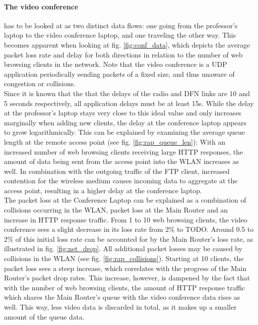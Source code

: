 \documentclass[
10pt, %
a4paper, %
oneside, %
headinclude,footinclude, %
BCOR5mm, %
]{scrartcl}
\begin{document}
\paragraph{The video conference} has to be looked at as two distinct data flows: one going from the professor's laptop to the video conference laptop, and one traveling the other way. This becomes apparent when looking at fig. \ref{fig:conf_data}, which depicts the average packet loss rate and delay for both directions in relation to the number of web browsing clients in the network. Note that the video conference is a UDP application periodically sending packets of a fixed size, and thus unaware of congestion or collisions.\\
Since it is known that the that the delays of the radio and DFN links are 10 and 5 seconds respectively, all application delays must be at least 15s. While the delay at the professor's laptop stays very close to this ideal value and only increases marginally when adding new clients, the delay at the conference laptop appears to grow logarithmically. This can be explained by examining the average queue length at the remote access point (see fig. \ref{fig:rap_queue_len}): With an increased number of web browsing clients receiving large HTTP responses, the amount of data being sent from the access point into the WLAN increases as well. In combination with the outgoing traffic of the FTP client, increased contention for the wireless medium causes incoming data to aggregate at the access point, resulting in a higher delay at the conference laptop.\\
The packet loss at the Conference Laptop can be explained as a combination of collisions occurring in the WLAN, packet loss at the Main Router and an increase in HTTP response traffic. From 1 to 10 web browsing clients, the video conference sees a slight decrease in its loss rate from 2\% to TODO. Around 0.5 to 2\% of this initial loss rate can be accounted for by the Main Router's loss rate, as illustrated in fig. \ref{fig:net_drop}. All additional packet losses may be caused by collisions in the WLAN (see fig. \ref{fig:rap_collisions}). Starting at 10 clients, the packet loss sees a steep increase, which correlates with the progress of the Main Router's packet drop rates. This increase, however, is dampened by the fact that with the number of web browsing clients, the amount of HTTP response traffic which shares the Main Router's queue with the video conference data rises as well. This way, less video data is discarded in total, as it makes up a smaller amount of the queue data.
\end{document}
